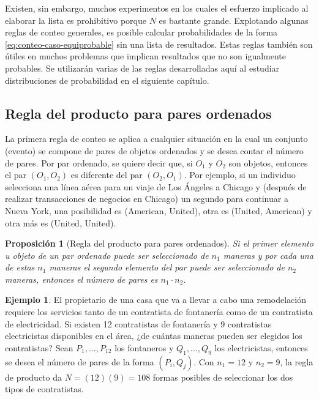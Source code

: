 \documentclass[
  11pt,
]{book}
\newtheorem{proposition}{Proposición}[chapter]
\theoremstyle{definition}
\theoremstyle{definition}
\newtheorem{example}{Ejemplo}[chapter]
\theoremstyle{definition}
\theoremstyle{definition}
\theoremstyle{remark}
\begin{document}
Existen, sin embargo, muchos experimentos en los cuales el esfuerzo implicado al elaborar la lista es prohibitivo porque \(N\) es bastante grande. Explotando algunas reglas de conteo generales, es posible calcular probabilidades de la forma \eqref{eq:conteo-caso-equiprobable} sin una lista de resultados. Estas reglas también son útiles en muchos problemas que implican resultados que no son igualmente probables. Se utilizarán varias de las reglas desarrolladas aquí al estudiar distribuciones de probabilidad en el siguiente capítulo.

\subsection{Regla del producto para pares ordenados}\label{regla-del-producto-para-pares-ordenados}

La primera regla de conteo se aplica a cualquier situación en la cual un conjunto (evento) se compone de pares de objetos ordenados y se desea contar el número de pares. Por par ordenado, se quiere decir que, si \(O_1\) y \(O_2\) son objetos, entonces el par \((O_1, O_2)\) es diferente del par \((O_2, O_1)\). Por ejemplo, si un individuo selecciona una línea aérea para un viaje de Los Ángeles a Chicago y (después de realizar transacciones de negocios en Chicago) un segundo para continuar a Nueva York, una posibilidad es (American, United), otra es (United, American) y otra más es (United, United).

\begin{proposition}[Regla del producto para pares ordenados]
Si el primer elemento u objeto de un par ordenado puede ser seleccionado de \(n_1\) maneras y por cada una de estas \(n_1\) maneras el segundo elemento del par puede ser seleccionado de \(n_2\) maneras, entonces el número de pares es \(n_1 \cdot n_2\).
\end{proposition}

\begin{example}
\protect\hypertarget{exm:ejemploconteo1}{}\label{exm:ejemploconteo1}El propietario de una casa que va a llevar a cabo una remodelación requiere los servicios tanto de un contratista de fontanería como de un contratista de electricidad. Si existen 12 contratistas de fontanería y 9 contratistas electricistas disponibles en el área, ¿de cuántas maneras pueden ser elegidos los contratistas? Sean \(P_1, \ldots, P_{12}\) los fontaneros y \(Q_1, \ldots, Q_9\) los electricistas, entonces se desea el número de pares de la forma \((P_i, Q_j)\). Con \(n_1 = 12\) y \(n_2 = 9\), la regla de producto da \(N = (12)(9) = 108\) formas posibles de seleccionar los dos tipos de contratistas.
\end{example}
\end{document}
